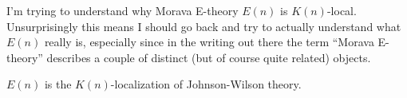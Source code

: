 

I'm trying to understand why Morava E-theory $E(n)$ is
$K(n)$-local. Unsurprisingly this means I should go back and try to
actually understand what $E(n)$ really is, especially since in the
writing out there the term ``Morava E-theory'' describes a couple of
distinct (but of course quite related) objects.

\begin{lemma}
  $E(n)$ is the $K(n)$-localization of Johnson-Wilson theory.
\end{lemma}

